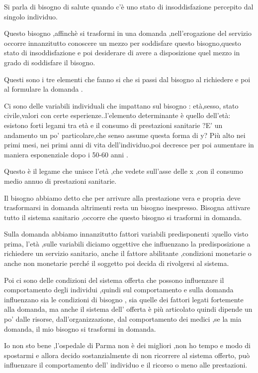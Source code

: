 Si parla di bisogno di salute quando c'è uno stato di insoddisfazione
percepito dal singolo individuo.

Questo bisogno ,affinchè si trasformi in una domanda ,nell'erogazione
del servizio occorre innanzitutto conoscere un mezzo per soddisfare
questo bisogno,questo stato di insoddisfazione e poi desiderare di avere
a disposizione quel mezzo in grado di soddisfare il bisogno.

Questi sono i tre elementi che fanno si che si passi dal bisogno al
richiedere e poi al formulare la domanda .

Ci sono delle variabili individuali che impattano sul bisogno :
età,sesso, stato civile,valori con certe esperienze..l'elemento
determinante è quello dell'età: esistono forti legami tra età e il
consumo di prestazioni sanitarie ?E' un andamento un po' particolare,che
senso assume questa forma di y? Più alto nei primi mesi, nei primi anni
di vita dell'individuo,poi decresce per poi aumentare in maniera
esponenziale dopo i 50-60 anni .

Questo è il legame che unisce l'età ,che vedete sull'asse delle x ,con
il consumo medio annuo di prestazioni sanitarie.

Il bisogno abbiamo detto che per arrivare alla prestazione vera e
propria deve trasformarsi in domanda altrimenti resta un bisogno
inespresso. Bisogna attivare tutto il sistema sanitario ,occorre che
questo bisogno si trasformi in domanda.

Sulla domanda abbiamo innanzitutto fattori variabili predisponenti
:quello visto prima, l'età ,sulle variabili diciamo oggettive che
influenzano la predisposizione a richiedere un servizio sanitario, anche
il fattore abilitante ,condizioni monetarie o anche non monetarie perché
il soggetto poi decida di rivolgersi al sistema.

Poi ci sono delle condizioni del sistema offerta che possono influenzare
il comportamento degli individui ,quindi sul comportamento e sulla
domanda influenzano sia le condizioni di bisogno , sia quelle dei
fattori legati fortemente alla domanda, ma anche il sistema dell'
offerta è più articolato quindi dipende un po' dalle risorse,
dall'organizzazione, dal comportamento dei medici ,se la mia domanda, il
mio bisogno si trasformi in domanda.

Io non sto bene ,l'ospedale di Parma non è dei migliori ,non ho tempo e
modo di spostarmi e allora decido sostanzialmente di non ricorrere al
sistema offerto, può influenzare il comportamento dell' individuo e il
ricorso o meno alle prestazioni.

